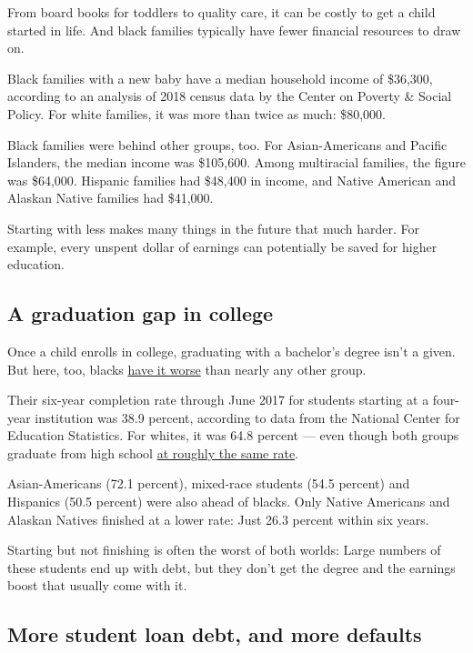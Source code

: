 From board books for toddlers to quality care, it can be costly to get a
child started in life. And black families typically have fewer financial
resources to draw on.

Black families with a new baby have a median household income of
\$36,300, according to an analysis of 2018 census data by the Center on
Poverty \& Social Policy. For white families, it was more than twice as
much: \$80,000.

Black families were behind other groups, too. For Asian-Americans and
Pacific Islanders, the median income was \$105,600. Among multiracial
families, the figure was \$64,000. Hispanic families had \$48,400 in
income, and Native American and Alaskan Native families had \$41,000.

Starting with less makes many things in the future that much harder. For
example, every unspent dollar of earnings can potentially be saved for
higher education.

\hypertarget{a-graduation-gap-in-college}{%
\subsection{A graduation gap in
college}\label{a-graduation-gap-in-college}}

Once a child enrolls in college, graduating with a bachelor's degree
isn't a given. But here, too, blacks
\href{https://www.nytimes.com/2018/03/25/opinion/college-graduation-gap.html}{have
it worse} than nearly any other group.

Their six-year completion rate through June 2017 for students starting
at a four-year institution was 38.9 percent, according to data from the
National Center for Education Statistics. For whites, it was 64.8
percent --- even though both groups graduate from high school
\href{https://nces.ed.gov/programs/dropout/ind_03.asp}{at roughly the
same rate}.

Asian-Americans (72.1 percent), mixed-race students (54.5 percent) and
Hispanics (50.5 percent) were also ahead of blacks. Only Native
Americans and Alaskan Natives finished at a lower rate: Just 26.3
percent within six years.

Starting but not finishing is often the worst of both worlds: Large
numbers of these students end up with debt, but they don't get the
degree and the earnings boost that usually come with it.

\hypertarget{more-student-loan-debt-and-more-defaults}{%
\subsection{More student loan debt, and more
defaults}\label{more-student-loan-debt-and-more-defaults}}

